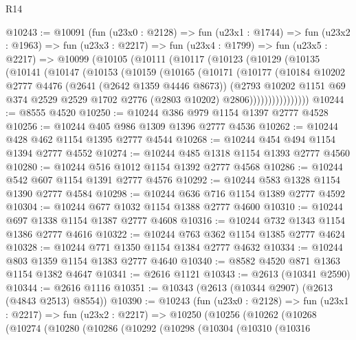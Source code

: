 \begin{lexlean}{R14}
\begin{coremodule}
@10243 := @10091
    (fun (u23x0 : @2128) =>
    fun (u23x1 : @1744) =>
    fun (u23x2 : @1963) =>
    fun (u23x3 : @2217) =>
    fun (u23x4 : @1799) =>
    fun (u23x5 : @2217) =>
    @10099
      (@10105
        (@10111
          (@10117
            (@10123
              (@10129
                (@10135
                  (@10141
                    (@10147
                      (@10153
                        (@10159
                          (@10165
                            (@10171
                              (@10177
                                (@10184
                                  @10202
                                  @2777
                                  @4476
                                  (@2641 (@2642 @1359 @4446 @8673))
                                  (@2793
                                    @10202
                                    @1151
                                    @69
                                    @374
                                    @2529
                                    @2529
                                    @1702
                                    @2776
                                    (@2803 @10202)
                                    @2806))))))))))))))))
@10244 := @8555 @4520
@10250 := @10244 @386 @979 @1154 @1397 @2777 @4528
@10256 := @10244 @405 @986 @1309 @1396 @2777 @4536
@10262 := @10244 @428 @462 @1154 @1395 @2777 @4544
@10268 := @10244 @454 @494 @1154 @1394 @2777 @4552
@10274 := @10244 @485 @1318 @1154 @1393 @2777 @4560
@10280 := @10244 @516 @1012 @1154 @1392 @2777 @4568
@10286 := @10244 @542 @607 @1154 @1391 @2777 @4576
@10292 := @10244 @583 @1328 @1154 @1390 @2777 @4584
@10298 := @10244 @636 @716 @1154 @1389 @2777 @4592
@10304 := @10244 @677 @1032 @1154 @1388 @2777 @4600
@10310 := @10244 @697 @1338 @1154 @1387 @2777 @4608
@10316 := @10244 @732 @1343 @1154 @1386 @2777 @4616
@10322 := @10244 @763 @362 @1154 @1385 @2777 @4624
@10328 := @10244 @771 @1350 @1154 @1384 @2777 @4632
@10334 := @10244 @803 @1359 @1154 @1383 @2777 @4640
@10340 := @8582 @4520 @871 @1363 @1154 @1382 @4647
@10341 := @2616 @1121
@10343 := @2613 (@10341 @2590)
@10344 := @2616 @1116
@10351 := @10343 (@2613 (@10344 @2907) (@2613 (@4843 @2513) @8554))
@10390 := @10243
    (fun (u23x0 : @2128) =>
    fun (u23x1 : @2217) =>
    fun (u23x2 : @2217) =>
    @10250
      (@10256
        (@10262
          (@10268
            (@10274
              (@10280
                (@10286
                  (@10292
                    (@10298
                      (@10304
                        (@10310
                          (@10316

\end{coremodule}
\end{lexlean}
